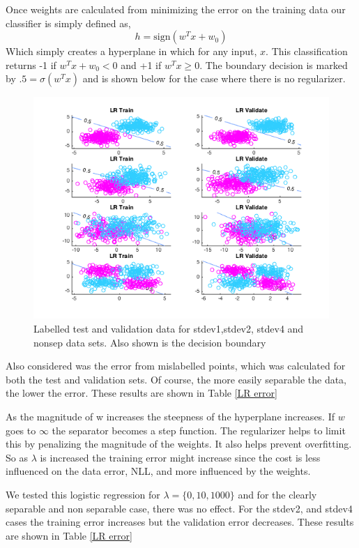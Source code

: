 \documentclass[10pt,twocolumn]{article}
\begin{document}
 Once weights are calculated from minimizing the error on the training data our classifier is simply defined as, 
 \begin{equation}
 h=\textrm{sign}(w^Tx +w_0)
 \end{equation}
 Which simply creates a hyperplane in which for any input, $x$. This classification returns -1 if $w^Tx+w_0<0$ and +1 if $w^Tx\geq 0$. The boundary decision is marked by $.5= \sigma (w^Tx)$ and is shown below for the case where there is no regularizer. 
 

 
 \begin{figure}[H]
\center
\includegraphics[scale =.4]{p1lambda0.png}
\caption{Labelled test and validation data for stdev1,stdev2, stdev4 and nonsep data sets. Also shown is the decision boundary }
\end{figure}
 
 Also considered was the error from mislabelled points, which was calculated for both the test and validation sets. Of course, the more easily separable the data, the lower the error. These results are shown in Table \ref{LR error}

As the magnitude of w increases the steepness of the hyperplane increases.  If $w$ goes to $ \infty$ the separator becomes a step function. The regularizer helps to limit this by penalizing the magnitude of the weights. It also helps prevent overfitting. So as $\lambda$ is increased the training error might increase since the cost is less influenced on the data error, NLL, and more influenced by the weights. 


We tested this logistic regression for $\lambda= \{0, 10, 1000\}$ and for the clearly separable and non separable case, there was no effect. For the stdev2, and stdev4 cases the training error increases but the validation error decreases. These results are shown in Table \ref{LR error}
\end{document}

